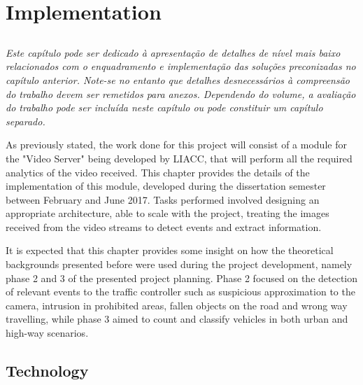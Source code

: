 \chapter{Implementation}\label{chap:chap4}
\listoftodos
\section*{}

\textit{
Este capítulo pode ser dedicado à apresentação de detalhes de nível
mais baixo relacionados com o enquadramento e implementação das
soluções preconizadas no capítulo anterior.
Note-se no entanto que detalhes desnecessários à compreensão do
trabalho devem ser remetidos para anexos.
Dependendo do volume, a avaliação do trabalho pode ser incluída neste
capítulo ou pode constituir um capítulo separado.
}


As previously stated, the work done for this project will consist of a module for the "Video Server" being developed by LIACC, that will perform all the required analytics of the video received. This chapter provides the details of the implementation of this module, developed during the dissertation semester between February and June 2017. Tasks performed involved designing an appropriate architecture, able to scale with the project, treating the images received from the video streams to detect events and extract information.

It is expected that this chapter provides some insight on how the theoretical backgrounds presented before were used during the project development, namely phase 2 and 3 of the presented project planning. Phase 2 focused on the detection of relevant events to the traffic controller such as suspicious approximation to the camera, intrusion in prohibited areas, fallen objects on the road and wrong way travelling, while phase 3 aimed to count and classify vehicles in both urban and high-way scenarios.

\section{Technology}

